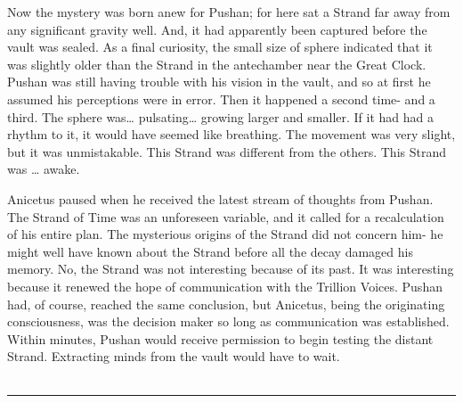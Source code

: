 \documentclass[a4paper]{article}
\begin{document}
Now the mystery was born anew for Pushan; for here sat a Strand far away from any significant gravity well. And, it had apparently been captured before the vault was sealed. As a final curiosity, the small size of sphere indicated that it was slightly older than the Strand in the antechamber near the Great Clock.
Pushan was still having trouble with his vision in the vault, and so at first he assumed his perceptions were in error. Then it happened a second time- and a third. The sphere was… pulsating… growing larger and smaller. If it had had a rhythm to it, it would have seemed like breathing. The movement was very slight, but it was unmistakable. This Strand was different from the others. This Strand was … awake.

Anicetus paused when he received the latest stream of thoughts from Pushan. The Strand of Time was an unforeseen variable, and it called for a recalculation of his entire plan. The mysterious origins of the Strand did not concern him- he might well have known about the Strand before all the decay damaged his memory. No, the Strand was not interesting because of its past. It was interesting because it renewed the hope of communication with the Trillion Voices.
Pushan had, of course, reached the same conclusion, but Anicetus, being the originating consciousness, was the decision maker so long as communication was established. Within minutes, Pushan would receive permission to begin testing the distant Strand. Extracting minds from the vault would have to wait. \\ \\

\hrule ~ \\ \\
\end{document}
